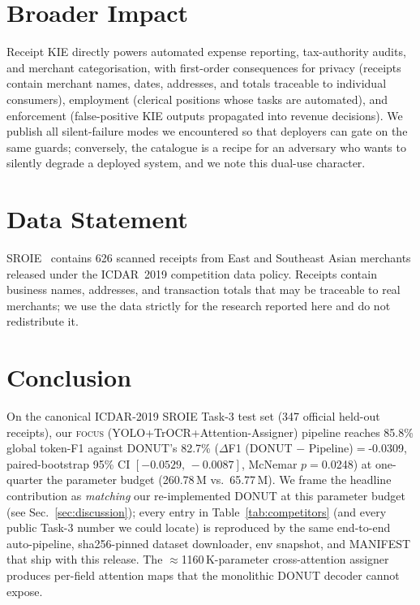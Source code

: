 \documentclass[conference]{IEEEtran}
\begin{document}
\section*{Broader Impact}

Receipt KIE directly powers automated expense reporting,
tax-authority audits, and merchant categorisation, with first-order
consequences for privacy (receipts contain merchant names, dates,
addresses, and totals traceable to individual consumers), employment
(clerical positions whose tasks are automated), and enforcement
(false-positive KIE outputs propagated into revenue decisions).
We publish all silent-failure modes we encountered so that deployers
can gate on the same guards; conversely, the catalogue is a recipe
for an adversary who wants to silently degrade a deployed system,
and we note this dual-use character.

\section*{Data Statement}

SROIE~\cite{huang2019icdar} contains 626 scanned receipts from East
and Southeast Asian merchants released under the ICDAR~2019
competition data policy.  Receipts contain business names,
addresses, and transaction totals that may be traceable to real
merchants; we use the data strictly for the research reported here
and do not redistribute it.

\section{Conclusion}

On the canonical ICDAR-2019 SROIE Task-3 test set (347
official held-out receipts), our \textsc{focus}
(YOLO+TrOCR+Attention-Assigner) pipeline reaches
85.8\% global token-F1 against
DONUT's 82.7\%
($\Delta$F1 (DONUT $-$ Pipeline)$=$-0.0309,
paired-bootstrap 95\% CI $[-0.0529,\,-0.0087]$,
McNemar $p=$0.0248) at one-quarter the parameter
budget (260.78\,M vs.\
65.77\,M).  We frame the headline contribution as
\emph{matching} our re-implemented DONUT at this parameter budget
(see Sec.~\ref{sec:discussion}); every entry in
Table~\ref{tab:competitors} (and every public Task-3 number we
could locate) is reproduced by the same
end-to-end auto-pipeline, sha256-pinned dataset
downloader, env snapshot, and MANIFEST that ship with this
release.  The
$\approx$1160\,K-parameter cross-attention
assigner produces per-field attention maps that the monolithic
DONUT decoder cannot expose.
\end{document}

